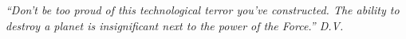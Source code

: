 \begin{epigrafe}
    \vspace*{\fill}
	\begin{flushright}
		\textit{``Don't be too proud of this technological terror you've constructed. The ability to destroy a planet is insignificant next to the power of the Force.'' D.V.}
	\end{flushright}
\end{epigrafe}
